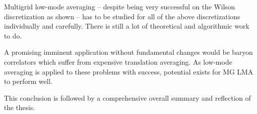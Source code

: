 Multigrid low-mode averaging -- despite being very successful on the Wilson discretization as shown -- has to be studied for all of the above discretizations individually and carefully.
There is still a lot of theoretical and algorithmic work to do.

A promising imminent application without fundamental changes would be baryon correlators which suffer from expensive translation averaging.
As low-mode averaging is applied to these problems with success, potential exists for MG LMA to perform well.

This conclusion is followed by a comprehensive overall summary and reflection of the thesis.


